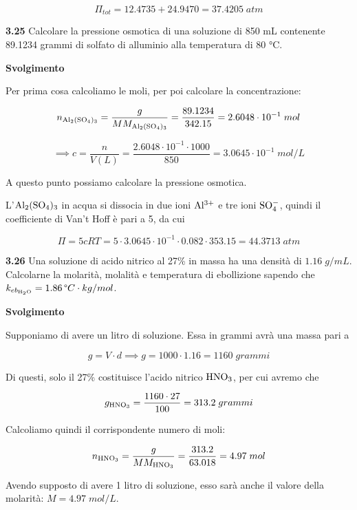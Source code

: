 $$\Pi_{tot}=12.4735 + 24.9470=37.4205\;atm$$

\vspace{0.2cm}\textbf{3.25} Calcolare la pressione osmotica di una soluzione di 850 mL contenente 89.1234 grammi di solfato di alluminio alla temperatura di 80 °C.

\vspace{0.2cm}\large\textbf{Svolgimento}\normalsize

\vspace{0.2cm}Per prima cosa calcoliamo le moli, per poi calcolare la concentrazione:

$$n_{\rm Al_2(SO_4)_3}=\frac{g}{MM_{\rm Al_2(SO_4)_3}}=\frac{89.1234}{342.15}=2.6048 \cdot 10^{-1}\;mol$$

$$\implies c=\frac{n}{V(L)}=\frac{2.6048 \cdot 10^{-1} \cdot 1000}{850}=3.0645 \cdot 10^{-1}\;mol/L$$

A questo punto possiamo calcolare la pressione osmotica.

L'$\rm Al_2(SO_4)_3$ in acqua si dissocia in due ioni $\rm Al^{3+}$ e tre ioni $\rm SO_4^-$, quindi il coefficiente di Van't Hoff è pari a 5, da cui

$$\Pi=5cRT
=5 \cdot 3.0645 \cdot 10^{-1} \cdot 0.082 \cdot 353.15
=44.3713\;atm$$

\vspace{0.2cm}\textbf{3.26} Una soluzione di acido nitrico al 27\% in massa ha una densità di $1.16\;g/mL$. Calcolarne la molarità, molalità e temperatura di ebollizione sapendo che $k_{eb_{\rm H_2O}}=1.86\,\text{°}C \cdot kg/mol$.

\vspace{0.2cm}\large\textbf{Svolgimento}\normalsize

\vspace{0.2cm}Supponiamo di avere un litro di soluzione. Essa in grammi avrà una massa pari a

$$g=V \cdot d \implies g=1000 \cdot 1.16 = 1160\;grammi$$

Di questi, solo il 27\% costituisce l'acido nitrico $\rm HNO_3$, per cui avremo che

$$g_{\rm HNO_3}=\frac{1160 \cdot 27}{100}=313.2\;grammi$$

Calcoliamo quindi il corrispondente numero di moli:

$$n_{\rm HNO_3}=\frac{g}{MM_{\rm HNO_3}}
=\frac{313.2}{63.018}=4.97\;mol$$

Avendo supposto di avere 1 litro di soluzione, esso sarà anche il valore della molarità: $M=4.97\;mol/L$.

